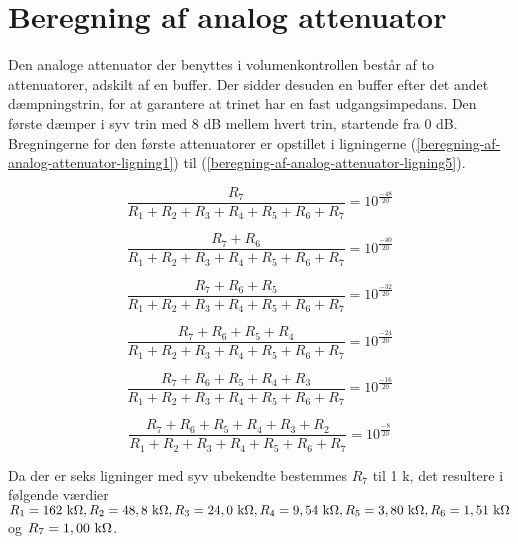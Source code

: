 \chapter{Beregning af analog attenuator}
\label{beregning-af-analog-attenuator}

Den analoge attenuator der benyttes i volumenkontrollen består af to attenuatorer, adskilt af en buffer. Der sidder desuden en buffer efter det andet dæmpningstrin, for at garantere at trinet har en fast udgangsimpedans. Den første dæmper i syv trin med 8 dB mellem hvert trin, startende fra 0 dB. Bregningerne for den første attenuatorer er opstillet i ligningerne (\ref{beregning-af-analog-attenuator-ligning1}) til (\ref{beregning-af-analog-attenuator-ligning5}).

\begin{equation}
\label{beregning-af-analog-attenuator-ligning1}
\frac{R_7}{R_1 + R_2 + R_3 + R_4 + R_5 + R_6 + R_7} = 10^{\frac{-48}{20}}
\end{equation}

\begin{equation}
\frac{R_7 + R_6}{R_1 + R_2 + R_3 + R_4 + R_5 + R_6 + R_7} = 10^{\frac{-40}{20}}
\end{equation}

\begin{equation}
\frac{R_7 + R_6 + R_5}{R_1 + R_2 + R_3 + R_4 + R_5 + R_6 + R_7} = 10^{\frac{-32}{20}}
\end{equation}

\begin{equation}
\frac{R_7 + R_6 + R_5 + R_4}{R_1 + R_2 + R_3 + R_4 + R_5 + R_6 + R_7} = 10^{\frac{-24}{20}}
\end{equation}

\begin{equation}
\frac{R_7 + R_6 + R_5 + R_4 + R_3}{R_1 + R_2 + R_3 + R_4 + R_5 + R_6 + R_7} = 10^{\frac{-16}{20}}
\end{equation}

\begin{equation}
\label{beregning-af-analog-attenuator-ligning5}
\frac{R_7 + R_6 + R_5 + R_4 + R_3 + R_2}{R_1 + R_2 + R_3 + R_4 + R_5 + R_6 + R_7} = 10^{\frac{-8}{20}}
\end{equation}

Da der er seks ligninger med syv ubekendte bestemmes $R_7$ til 1 k\ohm, det resultere i følgende værdier 
$R_1 = 162 ~\mathrm{k}\ohm, R_2 = 48,8 ~\mathrm{k}\ohm, R_3 = 24,0 ~\mathrm{k}\ohm, R_4 = 9,54 ~\mathrm{k}\ohm, R_5 = 3,80  ~\mathrm{k}\ohm, R_6 = 1,51 ~\mathrm{k}\ohm$ og $R_7 = 1,00 ~\mathrm{k}\ohm$.

